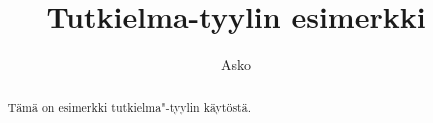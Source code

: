 \documentclass{tutkielma}
\title{Tutkielma-tyylin esimerkki}
\author{Asko}{Tapani}{Soukka}
\begin{document}
\maketitle

\begin{abstract}

Tämä on esimerkki tutkielma"-tyylin käytöstä.

\end{abstract}

\tableofcontents





\appendix


\end{document}
